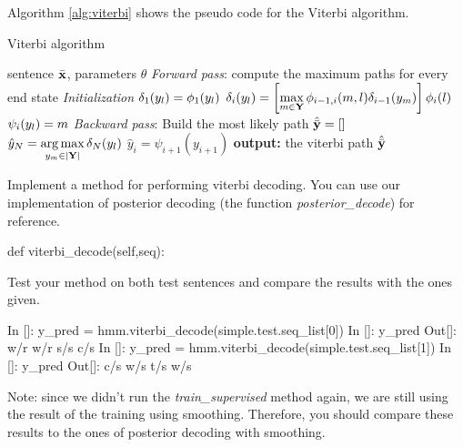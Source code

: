 Algorithm \ref{alg:viterbi} shows the pseudo code for the Viterbi algorithm.
\begin{algorithm}[t]
   \caption{Viterbi algorithm \label{alg:viterbi}}
\begin{algorithmic}[1]
    sentence $\bar{\mathbf{x}}$, parameters $\theta$
        \STATE  \emph{Forward pass}: compute the maximum paths for
        every end state
        \STATE \emph{Initialization}
        \STATE $\delta_1({y}_l) = \phi_1({y}_l)$
        \ENDFOR 
                 \STATE $\delta_i({y}_l) = \left[ \displaystyle
                   \max_{m  \in \mathbf{Y}} \phi_{i-1,i}(m,l)
                   \delta_{i-1}({y}_m) \right] \phi_i(l)$
                 \STATE $\psi_{i}({y}_l) = m$
         \ENDFOR 
        \ENDFOR 
       \STATE \emph{Backward pass}: Build the most likely path
       \STATE $\hat {\bar{\mathbf{y}}} = []$ 
       \STATE $\hat y_N = \displaystyle \operatorname*{arg\,max}_{{y}_m  \in
                   |\mathbf{Y} |}  \delta_N({y}_l)$
        \STATE $\hat  y_i = \psi_{i+1}(y_{i+1})$
        \ENDFOR 
       \STATE \textbf{output:} the viterbi path $\hat {\bar{\mathbf{y}}}$
\end{algorithmic}
\end{algorithm}


\begin{exercise}
Implement a method for performing viterbi decoding. You can use our implementation of posterior decoding (the function \emph{posterior\_decode}) for reference.
\begin{python}
        def viterbi_decode(self,seq):
\end{python}

Test your method on both test sentences and compare the results with
the ones given.
\begin{python}
In []: y_pred = hmm.viterbi_decode(simple.test.seq_list[0])
In []: y_pred
Out[]: w/r w/r s/s c/s 
In []: y_pred = hmm.viterbi_decode(simple.test.seq_list[1])
In []: y_pred
Out[]: c/s w/s t/s w/s 
\end{python}

Note: since we didn't run the \emph{train\_supervised} method again, we are still using the result of the training using smoothing. Therefore, you should compare these results to the ones of posterior decoding with smoothing.

\end{exercise}





